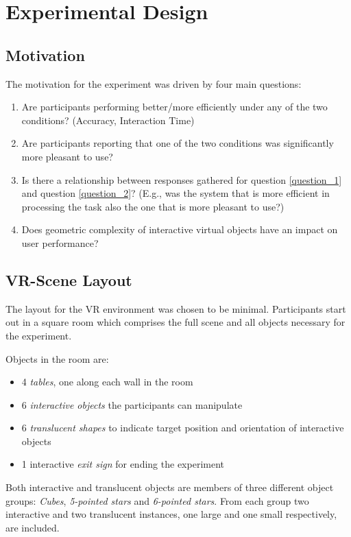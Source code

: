 \section{Experimental Design}


\subsection{Motivation}
The motivation for the experiment was driven by four main questions:
\begin{enumerate}
\item Are participants performing better/more efficiently under any of the two conditions? (Accuracy, Interaction Time)
\label{question_1}
\item Are participants reporting that one of the two conditions was significantly more pleasant to use?
\label{question_2}
\item Is there a relationship between responses gathered for question \ref{question_1} and question \ref{question_2}? (E.g., was the system that is more efficient in processing the task also the one that is more pleasant to use?)
\item Does geometric complexity of interactive virtual objects have an impact on user performance?
\end{enumerate}

\subsection{VR-Scene Layout}
The layout for the VR environment was chosen to be minimal. Participants start out in a square room which comprises the full scene and all objects necessary for the experiment.

Objects in the room are:
\begin{itemize}
\item 4 \textit{tables}, one along each wall in the room
\item 6 \textit{interactive objects} the participants can manipulate
\item 6 \textit{translucent shapes} to indicate target position and orientation of interactive objects
\item 1 interactive \textit{exit sign} for ending the experiment
\end{itemize}

Both interactive and translucent objects are members of three different object groups:
\textit{Cubes}, \textit{5-pointed stars} and \textit{6-pointed stars}. From each group two interactive and two translucent instances, one large and one small respectively, are included.

